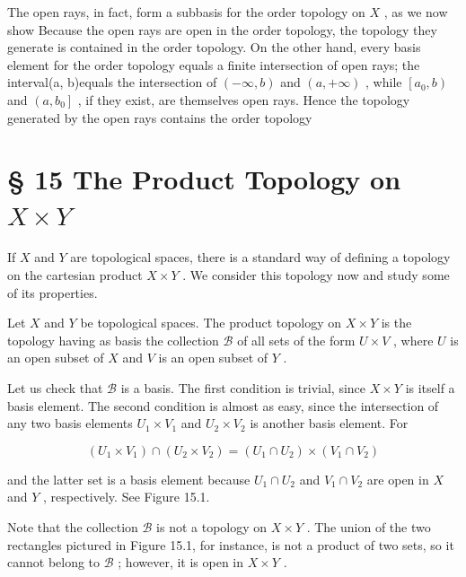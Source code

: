 The open rays, in fact, form a subbasis for the order topology on \(X\) , as we now show Because the open rays are open in the order topology, the topology they generate is contained in the order topology. On the other hand, every basis element for the order topology equals a finite intersection of open rays; the interval(a, b)equals the intersection of \(\left( {-\infty ,b}\right)\) and \(\left( {a, + \infty }\right)\) , while \(\left\lbrack  {{a}_{0},b}\right)\) and \(\left( {a,{b}_{0}}\right\rbrack\) , if they exist, are themselves open rays. Hence the topology generated by the open rays contains the order topology

\section*{§ 15 The Product Topology on \(X \times  Y\)}

If \(X\) and \(Y\) are topological spaces, there is a standard way of defining a topology on the cartesian product \(X \times  Y\) . We consider this topology now and study some of its properties.

\begin{definition} Let \(X\) and \(Y\) be topological spaces. The product topology on \(X \times  Y\) is the topology having as basis the collection \(\mathcal{B}\) of all sets of the form \(U \times  V\) , where \(U\) is an open subset of \(X\) and \(V\) is an open subset of \(Y\) .
\end{definition}

Let us check that \(\mathcal{B}\) is a basis. The first condition is trivial, since \(X \times  Y\) is itself a basis element. The second condition is almost as easy, since the intersection of any two basis elements \({U}_{1} \times  {V}_{1}\) and \({U}_{2} \times  {V}_{2}\) is another basis element. For

\[
\left( {{U}_{1} \times  {V}_{1}}\right)  \cap  \left( {{U}_{2} \times  {V}_{2}}\right)  = \left( {{U}_{1} \cap  {U}_{2}}\right)  \times  \left( {{V}_{1} \cap  {V}_{2}}\right)
\]

and the latter set is a basis element because \({U}_{1} \cap  {U}_{2}\) and \({V}_{1} \cap  {V}_{2}\) are open in \(X\) and \(Y\) , respectively. See Figure 15.1.

Note that the collection \(\mathcal{B}\) is not a topology on \(X \times  Y\) . The union of the two rectangles pictured in Figure 15.1, for instance, is not a product of two sets, so it cannot belong to \(\mathcal{B}\) ; however, it is open in \(X \times  Y\) .

